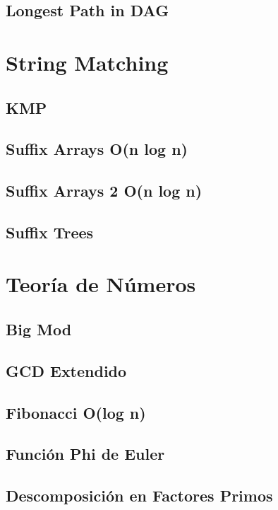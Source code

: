 \documentclass[10pt,letterpaper,twocolumn,twosided]{article}
\newcommand{\codigofuente}[1]{

\dotfill
}
\begin{document}
\subsection{Longest Path in DAG}

\codigofuente{./graphs/longest_path_in_dag.cpp}

\section{String Matching}
\subsection{KMP}
\codigofuente{./string_matching/kmp.cpp}
\subsection{Suffix Arrays O(n log n)}
\codigofuente{./string_matching/suffix_arrays.cpp}
\medskip
\subsection{Suffix Arrays 2 O(n log n)}
\codigofuente{./string_matching/suffarray.cpp}
\medskip
\subsection{Suffix Trees}
\codigofuente{./string_matching/sufftree.cpp}

\section{Teoría de Números}
\subsection{Big Mod}
\codigofuente{./teoria_numeros/bigMod.cpp}

\subsection{GCD Extendido}
\codigofuente{./teoria_numeros/extended_gcd.cpp}

\subsection{Fibonacci O(log n)}
\codigofuente{./teoria_numeros/fib.cpp}

\subsection{Función Phi de Euler}
\codigofuente{./teoria_numeros/phiEu.cpp}


\subsection{Descomposición en Factores Primos}
\codigofuente{./teoria_numeros/prim_factors.cpp}
\end{document}
